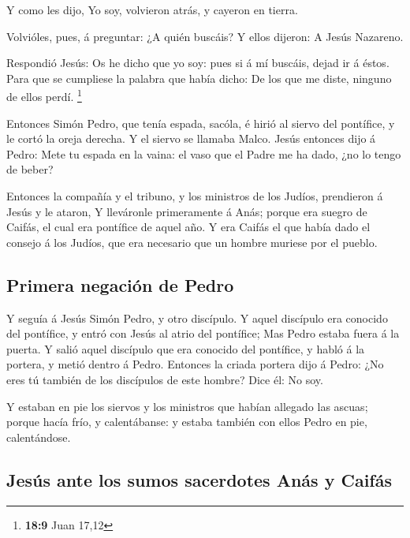  Y como les dijo, Yo soy, volvieron atrás, y cayeron en
tierra.

 Volvióles, pues, á preguntar: ¿A quién buscáis? Y ellos
dijeron: A Jesús Nazareno.

 Respondió Jesús: Os he dicho que yo soy: pues si á mí
buscáis, dejad ir á éstos.  Para que se cumpliese la palabra
que había dicho: De los que me diste, ninguno de ellos perdí.
\footnote{\textbf{18:9} Juan 17,12}

 Entonces Simón Pedro, que tenía espada, sacóla, é hirió al
siervo del pontífice, y le cortó la oreja derecha. Y el siervo se
llamaba Malco.  Jesús entonces dijo á Pedro: Mete tu espada
en la vaina: el vaso que el Padre me ha dado, ¿no lo tengo de beber?

 Entonces la compañía y el tribuno, y los ministros de los
Judíos, prendieron á Jesús y le ataron,  Y lleváronle
primeramente á Anás; porque era suegro de Caifás, el cual era pontífice
de aquel año.  Y era Caifás el que había dado el consejo á
los Judíos, que era necesario que un hombre muriese por el pueblo.

\hypertarget{primera-negaciuxf3n-de-pedro}{%
\subsection{Primera negación de
Pedro}\label{primera-negaciuxf3n-de-pedro}}

 Y seguía á Jesús Simón Pedro, y otro discípulo. Y aquel
discípulo era conocido del pontífice, y entró con Jesús al atrio del
pontífice;  Mas Pedro estaba fuera á la puerta. Y salió
aquel discípulo que era conocido del pontífice, y habló á la portera, y
metió dentro á Pedro.  Entonces la criada portera dijo á
Pedro: ¿No eres tú también de los discípulos de este hombre? Dice él: No
soy.

 Y estaban en pie los siervos y los ministros que habían
allegado las ascuas; porque hacía frío, y calentábanse: y estaba también
con ellos Pedro en pie, calentándose.

\hypertarget{jesuxfas-ante-los-sumos-sacerdotes-anuxe1s-y-caifuxe1s}{%
\subsection{Jesús ante los sumos sacerdotes Anás y
Caifás}\label{jesuxfas-ante-los-sumos-sacerdotes-anuxe1s-y-caifuxe1s}}

